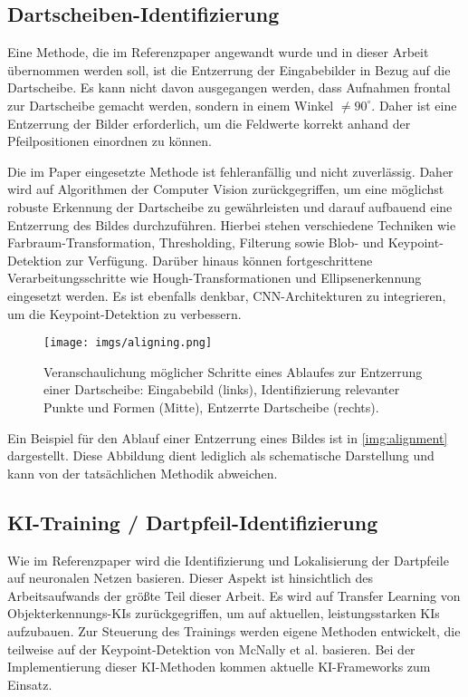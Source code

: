 \subsection{Dartscheiben-Identifizierung}
\label{sec:methodik:dartscheibe}

Eine Methode, die im Referenzpaper angewandt wurde und in dieser Arbeit übernommen werden soll, ist die Entzerrung der Eingabebilder in Bezug auf die Dartscheibe. Es kann nicht davon ausgegangen werden, dass Aufnahmen frontal zur Dartscheibe gemacht werden, sondern in einem Winkel $\neq90^\circ$. Daher ist eine Entzerrung der Bilder erforderlich, um die Feldwerte korrekt anhand der Pfeilpositionen einordnen zu können.

Die im Paper eingesetzte Methode ist fehleranfällig und nicht zuverlässig. Daher wird auf Algorithmen der Computer Vision zurückgegriffen, um eine möglichst robuste Erkennung der Dartscheibe zu gewährleisten und darauf aufbauend eine Entzerrung des Bildes durchzuführen. Hierbei stehen verschiedene Techniken wie Farbraum-Transformation, Thresholding, Filterung sowie Blob- und Keypoint-Detektion zur Verfügung. Darüber hinaus können fortgeschrittene Verarbeitungsschritte wie Hough-Transformationen und Ellipsenerkennung eingesetzt werden. Es ist ebenfalls denkbar, CNN-Architekturen zu integrieren, um die Keypoint-Detektion zu verbessern.

\begin{figure}
    \centering
    \texttt{[image: imgs/aligning.png]}
    \caption{Veranschaulichung möglicher Schritte eines Ablaufes zur Entzerrung einer Dartscheibe: Eingabebild (links), Identifizierung relevanter Punkte und Formen (Mitte), Entzerrte Dartscheibe (rechts).}
    \label{img:alignment}
\end{figure}

Ein Beispiel für den Ablauf einer Entzerrung eines Bildes ist in \autoref{img:alignment} dargestellt. Diese Abbildung dient lediglich als schematische Darstellung und kann von der tatsächlichen Methodik abweichen.

\subsection{KI-Training / Dartpfeil-Identifizierung}
\label{sec:methodik:ki}

Wie im Referenzpaper wird die Identifizierung und Lokalisierung der Dartpfeile auf neuronalen Netzen basieren. Dieser Aspekt ist hinsichtlich des Arbeitsaufwands der größte Teil dieser Arbeit. Es wird auf Transfer Learning von Objekterkennungs-KIs zurückgegriffen, um auf aktuellen, leistungsstarken KIs aufzubauen. Zur Steuerung des Trainings werden eigene Methoden entwickelt, die teilweise auf der Keypoint-Detektion von McNally et al. basieren. Bei der Implementierung dieser KI-Methoden kommen aktuelle KI-Frameworks zum Einsatz.

